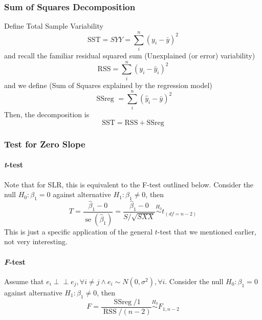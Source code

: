 \documentclass[10pt]{article}
\newcommand{\independent}{\perp \!\!\! \perp}
\begin{document}
\subsubsection{Sum of Squares Decomposition}
Define \color{Thistle} Total Sample Variability \color{Black}
\begin{equation*}
    \mathrm{SST}=S Y Y=\sum_{i}^{n}\left(y_{i}-\bar{y}\right)^{2}
\end{equation*}
and recall the familiar residual squared sum \color{Thistle} (Unexplained (or error) variability) \color{Black}
\begin{equation*}
    \mathrm{RSS}=\sum_{i}^{n}\left(y_{i}-\hat{y}_{i}\right)^{2}
\end{equation*}
and we define \color{Thistle}(Sum of Squares explained by the regression model) \color{Black}
\begin{equation*}
    \text { SSreg }=\sum_{i}^{n}\left(\hat{y}_{i}-\bar{y}\right)^{2}
\end{equation*}
Then, the decomposition is
\begin{equation*}
    \text{SST} = \mathrm{RSS} + \text {SSreg}
\end{equation*}

\subsubsection{Test for Zero Slope}
\paragraph{\textit{t}-test} Note that for SLR, this is equivalent to the F-test outlined below. Consider the null $H_0: \beta_1 = 0$ against alternative $H_1: \beta_1 \neq 0$, then
\begin{equation*}
    T=\frac{\hat{\beta}_{1}-0}{\operatorname{se}\left(\hat{\beta}_{1}\right)} = \frac{\hat{\beta}_{1}- 0}{S / \sqrt{S X X}} \overset{H_0}{\sim} t_{(df = n-2)} 
\end{equation*}
This is just a specific application of the general $t$-test that we mentioned earlier, not very interesting. 

\paragraph{\textit{F}-test}
Assume that $e_i\independent e_j, \forall i\neq j \land e_i\sim N(0, \sigma^2), \forall i$. Consider the null $H_0: \beta_1 = 0$ against alternative $H_1: \beta_1 \neq 0$, then
\begin{equation*}
    F=\frac{\operatorname{SSreg} / 1}{\operatorname{RSS} /(n-2)} \overset{H_0}{\sim} F_{1, n-2}
\end{equation*}
\end{document}
